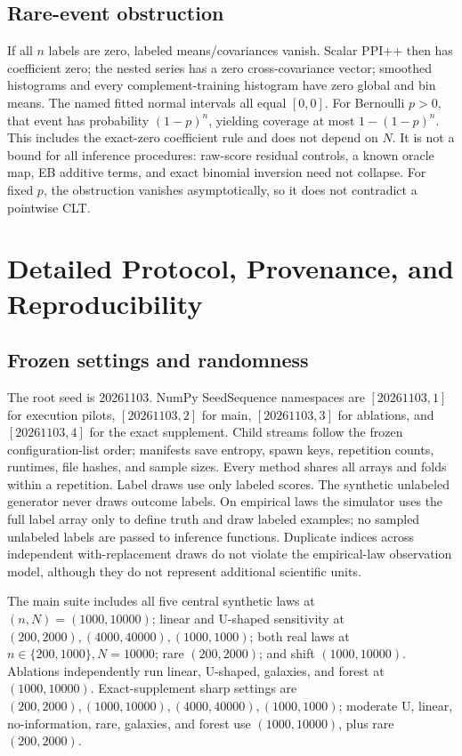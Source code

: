 \documentclass{article}
\begin{document}
\subsection{Rare-event obstruction}
If all $n$ labels are zero, labeled means/covariances vanish. Scalar PPI++ then has coefficient zero; the nested series has a zero cross-covariance vector; smoothed histograms and every complement-training histogram have zero global and bin means. The named fitted normal intervals all equal $[0,0]$. For Bernoulli $p>0$, that event has probability $(1-p)^n$, yielding coverage at most $1-(1-p)^n$. This includes the exact-zero coefficient rule and does not depend on $N$. It is not a bound for all inference procedures: raw-score residual controls, a known oracle map, EB additive terms, and exact binomial inversion need not collapse. For fixed $p$, the obstruction vanishes asymptotically, so it does not contradict a pointwise CLT.

\section{Detailed Protocol, Provenance, and Reproducibility}
\label{app:protocol}
\subsection{Frozen settings and randomness}
The root seed is 20261103. NumPy SeedSequence namespaces are $[20261103,1]$ for execution pilots, $[20261103,2]$ for main, $[20261103,3]$ for ablations, and $[20261103,4]$ for the exact supplement. Child streams follow the frozen configuration-list order; manifests save entropy, spawn keys, repetition counts, runtimes, file hashes, and sample sizes. Every method shares all arrays and folds within a repetition. Label draws use only labeled scores. The synthetic unlabeled generator never draws outcome labels. On empirical laws the simulator uses the full label array only to define truth and draw labeled examples; no sampled unlabeled labels are passed to inference functions. Duplicate indices across independent with-replacement draws do not violate the empirical-law observation model, although they do not represent additional scientific units.

The main suite includes all five central synthetic laws at $(n,N)=(1000,10000)$; linear and U-shaped sensitivity at $(200,2000),(4000,40000),(1000,1000)$; both real laws at $n\in\{200,1000\},N=10000$; rare $(200,2000)$; and shift $(1000,10000)$. Ablations independently run linear, U-shaped, galaxies, and forest at $(1000,10000)$. Exact-supplement sharp settings are $(200,2000),(1000,10000),(4000,40000),(1000,1000)$; moderate U, linear, no-information, rare, galaxies, and forest use $(1000,10000)$, plus rare $(200,2000)$.
\end{document}
